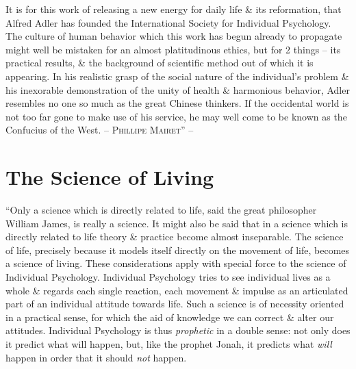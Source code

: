 \documentclass{article}
\numberwithin{equation}{section}
\begin{document}
It is for this work of releasing a new energy for daily life \& its reformation, that Alfred Adler has founded the International Society for Individual Psychology. The culture of human behavior which this work has begun already to propagate might well be mistaken for an almost platitudinous ethics, but for 2 things -- its practical results, \& the background of scientific method out of which it is appearing. In his realistic grasp of the social nature of the individual's problem \& his inexorable demonstration of the unity of health \& harmonious behavior, Adler resembles no one so much as the great Chinese thinkers. If the occidental world is not too far gone to make use of his service, he may well come to be known as the Confucius of the West. -- \textsc{Phillipe Mairet}'' -- \cite[pp. 9--30]{Adler2013}


\section{The Science of Living}
``Only a science which is directly related to life, said the great philosopher William James, is really a science. It might also be said that in a science which is directly related to life theory \& practice become almost inseparable. The science of life, precisely because it models itself directly on the movement of life, becomes a science of living. These considerations apply with special force to the science of Individual Psychology. Individual Psychology tries to see individual lives as a whole \& regards each single reaction, each movement \& impulse as an articulated part of an individual attitude towards life. Such a science is of necessity oriented in a practical sense, for which the aid of knowledge we can correct \& alter our attitudes. Individual Psychology is thus \textit{prophetic} in a double sense: not only does it predict what will happen, but, like the prophet Jonah, it predicts what \textit{will} happen in order that it should \textit{not} happen.
\end{document}
